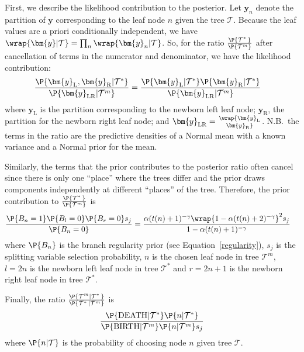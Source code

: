 \documentclass[article]{jss}
\begin{document}
First, we describe the likelihood contribution to the posterior.  Let
$\bm{y}_n$ denote the partition of $\bm{y}$ corresponding to the leaf
node $n$ given the tree $\mathcal{T}$.  Because the leaf values are a
priori conditionally independent, we have
$\wrap{\bm{y}|\mathcal{T}}=\prod_n\wrap{\bm{y}_n|\mathcal{T}}$.  So,
for the ratio $\frac{\P{\mathcal{T}^*\,}}{\P{\mathcal{T}^m}}$ after
cancellation of terms in the numerator and denominator, we have
the likelihood contribution:
\begin{align*}
\frac{\P{\bm{y}_{\mathrm{L}},\bm{y}_{\mathrm{R}}|\mathcal{T}^*}}
{\P{\bm{y}_{\mathrm{LR}}|\mathcal{T}^m}}
&=\frac{\P{\bm{y}_{\mathrm{L}}|\mathcal{T}^*}
\P{\bm{y}_{\mathrm{R}}|\mathcal{T}^*}}
{\P{\bm{y}_{\mathrm{LR}}|\mathcal{T}^m}}
\end{align*}
where $\bm{y}_{\mathrm{L}}$ is the partition corresponding to the
newborn left leaf node; $\bm{y}_{\mathrm{R}}$, the partition for the
newborn right leaf node; and
$\bm{y}_{\mathrm{LR}}=\wrap{\bm{y}_{\mathrm{L}} \atop \bm{y}_{\mathrm{R}}}$.
N.B.\ the terms in the ratio are the predictive densities of a Normal
mean with a known variance and a Normal prior for the mean.

Similarly, the terms that the prior contributes to the posterior ratio
often cancel since there is only one ``place'' where the trees differ
and the prior draws components independently at different ``places''
of the tree.  Therefore, the prior contribution to
$\frac{\P{\mathcal{T}^*\,}}{\P{\mathcal{T}^m}}$ is 
\begin{align*}
\frac{\P{B_n=1}\P{B_l=0} \P{B_r=0} s_j} {\P{B_n=0}} & =
\frac{\alpha(t(n)+1)^{-\gamma}\wrap{1-\alpha(t(n)+2)^{-\gamma}}^2 s_j}
{1-\alpha(t(n)+1)^{-\gamma}}
\end{align*}
where $\P{B_n}$ is the branch regularity prior (see
Equation~\ref{regularity}), $s_j$ is the splitting variable selection
probability, $n$ is the chosen leaf node in tree $\mathcal{T}^m$,
$l=2n$ is the newborn left leaf node in tree $\mathcal{T}^*$ and
$r=2n+1$ is the newborn right leaf node in tree $\mathcal{T}^*$.

Finally, the ratio $ \frac{\P{\mathcal{T}^m|\mathcal{T}^*\,}}
{\P{\mathcal{T}^*\,|\mathcal{T}^m}}$ is 
\begin{align*}
\frac{\P{\mathrm{DEATH}|\mathcal{T}^*}
\P{n|\mathcal{T}^*}}
{\P{\mathrm{BIRTH}|\mathcal{T}^m}\P{n|\mathcal{T}^m} s_j}
\end{align*}
where $\P{n|\mathcal{T}} $ is the probability of choosing node
$n$ given tree $\mathcal{T}$.
\end{document}
